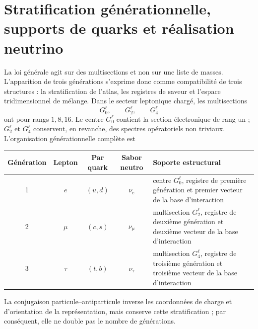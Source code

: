 \section{Stratification générationnelle, supports de quarks et réalisation neutrino}
\label{sec:generaciones-quarks-neutrinos-rev2}

La loi générale agit sur des multisections et non sur une liste de masses.
L'apparition de trois générations s'exprime donc comme compatibilité de
trois structures : la stratification de l'atlas, les registres de saveur et
l'espace tridimensionnel de mélange. Dans le secteur leptonique chargé, les
multisections
\begin{equation}
 G_0^{\ell},\qquad G_2^{\ell},\qquad G_4^{\ell}
 \label{eq:tres-multisecciones-leptonicas-rev2}
\end{equation}
ont pour rangs \(1,8,16\). Le centre \(G_0^\ell\) contient la section
électronique de rang un ; \(G_2^\ell\) et \(G_4^\ell\) conservent, en revanche,
des spectres opératoriels non triviaux. L'organisation générationnelle complète
est
\begin{center}
\small
\begin{tabularx}{0.96\textwidth}{@{}c c c c X@{}}
\toprule
\textbf{Génération} & \textbf{Lepton} & \textbf{Par quark} &
\textbf{Sabor neutro} & \textbf{Soporte estructural}\\
\midrule
1 & \(e\) & \((u,d)\) & \(\nu_e\) & centre \(G_0^\ell\), registre de
première génération et premier vecteur de la base d'interaction\\
2 & \(\mu\) & \((c,s)\) & \(\nu_\mu\) & multisection \(G_2^\ell\),
registre de deuxième génération et deuxième vecteur de la base d'interaction\\
3 & \(\tau\) & \((t,b)\) & \(\nu_\tau\) & multisection \(G_4^\ell\),
registre de troisième génération et troisième vecteur de la base d'interaction\\
\bottomrule
\end{tabularx}
\end{center}
La conjugaison particule--antiparticule inverse les coordonnées de charge et
d'orientation de la représentation, mais conserve cette stratification ; par
conséquent, elle ne double pas le nombre de générations.

